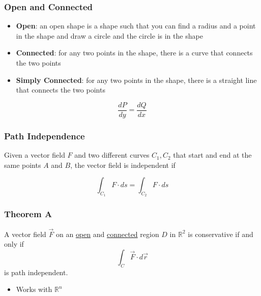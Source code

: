     \subsubsection{Open and Connected}

      \begin{itemize}
        \item \textbf{Open}: an open shape is a shape such that you
        can find a radius and a point in the shape and draw a circle
        and the circle is in the shape
        \item \textbf{Connected}: for any two points in the shape, there is a
        curve that connects the two points
        \item \textbf{Simply Connected}: for any two points in the shape,
        there is a straight line that connects the two points
      \end{itemize}

      \begin{equation}
        \frac{dP}{dy} = \frac{dQ}{dx}
      \end{equation}

    \subsubsection{Path Independence}

      Given a vector field $ F $ and two different curves
      $ C_{1}, C_{2} $ that start and end at the same points $ A $ and $ B $,
      the vector field is independent if

      \begin{equation}
        \int_{C_{1}} F \cdot ds = \int_{C_{2}} F \cdot ds
      \end{equation}

    \subsubsection{Theorem A}

      A vector field $ \vec{F} $ on an \ul{open} and \ul{connected} region
      $ D $ in $ \mathbb{R}^{2} $ is conservative if and only if
      \begin{displaymath}
        \int_{C} \vec{F} \cdot d\vec{r}
      \end{displaymath}
      is path independent.

      \begin{itemize}
        \item Works with $ \mathbb{R}^{n} $
      \end{itemize}

